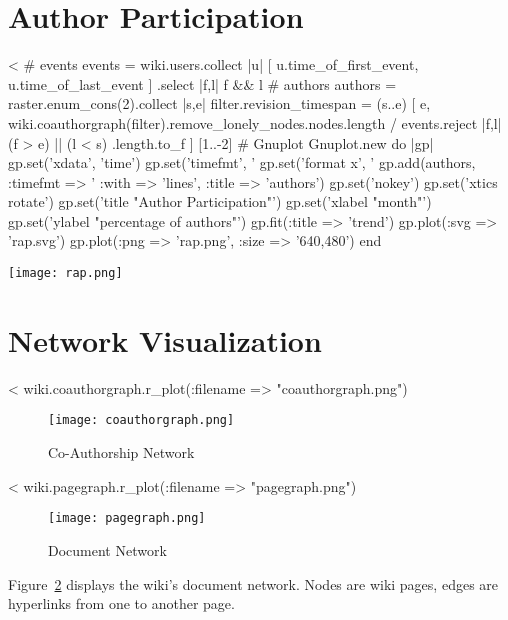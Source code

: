 \documentclass{scrartcl}
\begin{document}

\section{Author Participation} %
\label{sec:author_participation}

<%
# events
events = wiki.users.collect{ |u| 
	[ u.time_of_first_event, u.time_of_last_event ] 
    }.select { |f,l| f && l }
# authors
authors = raster.enum_cons(2).collect { |s,e|
	filter.revision_timespan = (s..e)
	[ e,
    	wiki.coauthorgraph(filter).remove_lonely_nodes.nodes.length /
        events.reject { |f,l| (f > e) || (l < s) }.length.to_f ]
	}[1..-2]
# Gnuplot
Gnuplot.new do |gp|
	gp.set('xdata', 'time')
	gp.set('timefmt', '%
	gp.set('format x', '%
	gp.add(authors, :timefmt => '%
		:with => 'lines',
		:title => 'authors')
	gp.set('nokey')
	gp.set('xtics rotate')
	gp.set('title "Author Participation"')
	gp.set('xlabel "month"')
	gp.set('ylabel "percentage of authors"')
	gp.fit(:title => 'trend')
	gp.plot(:svg => 'rap.svg')
	gp.plot(:png => 'rap.png', :size => '640,480')
end
\begin{center}
  \texttt{[image: rap.png]}
\end{center}


\section{Network Visualization} %
\label{sec:network_visualization}

<%
wiki.coauthorgraph.r_plot(:filename => "coauthorgraph.png")
\begin{figure}
	\centering
	\texttt{[image: coauthorgraph.png]}
	\caption{Co-Authorship Network}
	\label{fig:co-authorship_network}
\end{figure}

<%
wiki.pagegraph.r_plot(:filename => "pagegraph.png")

\begin{figure}
	\centering
	\texttt{[image: pagegraph.png]}
	\caption{Document Network}
	\label{fig:document_network}
\end{figure}

Figure~\ref{fig:document_network} displays the wiki's document network. Nodes are wiki pages, edges are hyperlinks from one to another page. 




\end{document}

